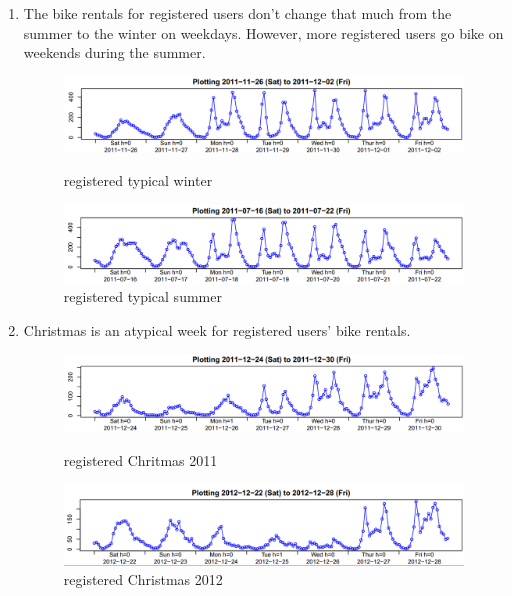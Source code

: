 \documentclass[12pt]{article}
\begin{document}
\begin{enumerate}
		 \item The bike rentals for registered users don't change that much from the summer to the winter on weekdays. However, more registered users go bike on weekends during the summer.
		 	\begin{figure}[H]
		 		\centering
		 		\begin{minipage}{.5\textwidth}
		 			\centering
		 			\includegraphics[width=\linewidth]{figures/registered_typical_winter.png}
		 			\caption{registered typical winter}
		 		\end{minipage}%
		 		\begin{minipage}{.5\textwidth}
		 			\centering
		 			\includegraphics[width=\linewidth]{figures/registered_typical_summer.png}
		 			\caption{registered typical summer}
		 		\end{minipage}
		 	\end{figure}
		 	
		\item Christmas is an atypical week for registered users' bike rentals. 
			 \begin{figure}[H]
			 	\centering
			 	\begin{minipage}{.5\textwidth}
			 		\centering
			 		\includegraphics[width=\linewidth]{figures/registered_christmas_2011.png}
			 		\caption{registered Chritmas 2011}
			 	\end{minipage}%
			 	\begin{minipage}{.5\textwidth}
			 		\centering
			 		\includegraphics[width=\linewidth]{figures/registered_christmas_2012.png}
			 		\caption{registered Christmas 2012}
			 	\end{minipage}
			 \end{figure}
		\end{enumerate}
		
\end{document}
